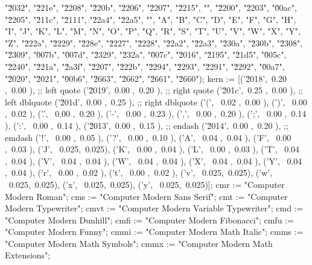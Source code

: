 {             "\u2032", "\u221e", "\u2208", "\u220b", "\u2206", "\u2207", "\u2215", "",
             "\u2200", "\u2203", "\u00ac", "\u2205", "\u211c", "\u2111", "\u22a4", "\u22a5",
             "", "A",      "B",      "C",      "D",      "E",      "F",      "G",
             "H",      "I",      "J",      "K",      "L",      "M",      "N",      "O",
             "P",      "Q",      "R",      "S",      "T",      "U",      "V",      "W",
             "X",      "Y",      "Z",      "\u222a", "\u2229", "\u228e", "\u2227", "\u2228",
             "\u22a2", "\u22a3", "\u230a", "\u230b", "\u2308", "\u2309", "\u007b", "\u007d",
             "\u2329", "\u232a", "\u007c", "\u2016", "\u2195", "\u21d5", "\u005c", "\u2240",
             "\u221a", "\u2a3f", "\u2207", "\u222b", "\u2294", "\u2293", "\u2291", "\u2292",
             "\u00a7", "\u2020", "\u2021", "\u00b6", "\u2663", "\u2662", "\u2661", "\u2660");
    kern := [('\u2018',~0.20 ,~0.00 ),  ;; left quote
             ('\u2019',~0.00 ,~0.20 ),  ;; right quote
             ('\u201c',~0.25 ,~0.00 ),  ;; left dblquote
             ('\u201d',~0.00 ,~0.25 ),  ;; right dblquote
             ('(',     ~0.02 ,~0.00 ),
             (')',     ~0.00 ,~0.02 ),
             ('.',     ~0.00 ,~0.20 ),
             ('-',     ~0.00 ,~0.23 ),
             (',',     ~0.00 ,~0.20 ),
             (';',     ~0.00 ,~0.14 ),
             (':',     ~0.00 ,~0.14 ),
             ('\u2013',~0.00 ,~0.15 ),  ;; endash
             ('\u2014',~0.00 ,~0.20 ),  ;; emdash
             ('!',     ~0.00 ,~0.05 ),
             ('?',     ~0.00 ,~0.10 ),
             ('A',     ~0.04 ,~0.04 ),
             ('F',     ~0.00 ,~0.03 ),
             ('J',     ~0.025,~0.025),
             ('K',     ~0.00 ,~0.04 ),
             ('L',     ~0.00 ,~0.03 ),
             ('T',     ~0.04 ,~0.04 ),
             ('V',     ~0.04 ,~0.04 ),
             ('W',     ~0.04 ,~0.04 ),
             ('X',     ~0.04 ,~0.04 ),
             ('Y',     ~0.04 ,~0.04 ),
             ('r',     ~0.00 ,~0.02 ),
             ('t',     ~0.00 ,~0.02 ),
             ('v',     ~0.025,~0.025),
             ('w',     ~0.025,~0.025),
             ('x',     ~0.025,~0.025),
             ('y',     ~0.025,~0.025)];
    cmr  := "Computer Modern Roman";
    cms  := "Computer Modern Sans Serif";
    cmt  := "Computer Modern Typewriter";
    cmvt := "Computer Modern Variable Typewriter";
    cmd  := "Computer Modern Dunhill";
    cmfi := "Computer Modern Fibonacci";
    cmfu := "Computer Modern Funny";
    cmmi := "Computer Modern Math Italic";
    cmms := "Computer Modern Math Symbols";
    cmmx := "Computer Modern Math Extensions";
}
